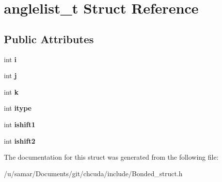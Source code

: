 \hypertarget{structanglelist__t}{}\section{anglelist\+\_\+t Struct Reference}
\label{structanglelist__t}
\subsection*{Public Attributes}
\begin{DoxyCompactItemize}
\item 
\hypertarget{structanglelist__t_aa5d6d6d05e695d8a1f2110002ca5cb73}{}\label{structanglelist__t_aa5d6d6d05e695d8a1f2110002ca5cb73} 
int {\bfseries i}
\item 
\hypertarget{structanglelist__t_afbad946f69f0672f3d9c2898f8f2d275}{}\label{structanglelist__t_afbad946f69f0672f3d9c2898f8f2d275} 
int {\bfseries j}
\item 
\hypertarget{structanglelist__t_a2a27a03f8d7f72303a60991da41d96f6}{}\label{structanglelist__t_a2a27a03f8d7f72303a60991da41d96f6} 
int {\bfseries k}
\item 
\hypertarget{structanglelist__t_a912c3fb8b562d986f74109ff2b381680}{}\label{structanglelist__t_a912c3fb8b562d986f74109ff2b381680} 
int {\bfseries itype}
\item 
\hypertarget{structanglelist__t_a950c186063510ada51d25a71eb948d47}{}\label{structanglelist__t_a950c186063510ada51d25a71eb948d47} 
int {\bfseries ishift1}
\item 
\hypertarget{structanglelist__t_a81c1135d7607e6ca1e3504a9944149a7}{}\label{structanglelist__t_a81c1135d7607e6ca1e3504a9944149a7} 
int {\bfseries ishift2}
\end{DoxyCompactItemize}


The documentation for this struct was generated from the following file\+:\begin{DoxyCompactItemize}
\item 
/u/samar/\+Documents/git/chcuda/include/Bonded\+\_\+struct.\+h\end{DoxyCompactItemize}
